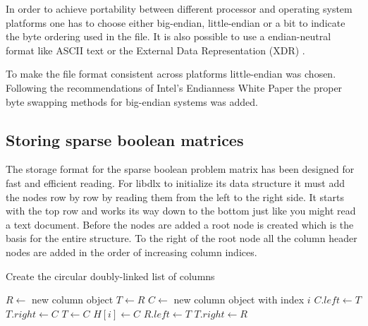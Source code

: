 In order to achieve portability between different processor and operating system platforms one has to choose either big-endian, little-endian or a bit to indicate the byte ordering used in the file.
It is also possible to use a endian-neutral format like ASCII text or the External Data Representation (XDR) \cite{RFC4506}.

To make the file format consistent across platforms little-endian was chosen.
Following the recommendations of Intel's Endianness White Paper \cite{intel-endian} the proper byte swapping methods for big-endian systems was added.




\subsection{Storing sparse boolean matrices}

The storage format for the sparse boolean problem matrix has been designed for fast and efficient reading.
For libdlx to initialize its data structure it must add the nodes row by row by reading them from the left to the right side.
It starts with the top row and works its way down to the bottom just like you might read a text document.
Before the nodes are added a root node is created which is the basis for the entire structure.
To the right of the root node all the column header nodes are added in the order of increasing column indices.

\begin{algorithm}
	\caption{Create the circular doubly-linked list of columns}
	\label{alg:columns}
	\begin{algorithmic}[1]
		\STATE $R \leftarrow$ new column object
		\STATE $T \leftarrow R$
			\STATE $C \leftarrow$ new column object with index $i$
				\STATE $C.left \leftarrow T$
				\STATE $T.right \leftarrow C$
			\ENDIF
			\STATE $T \leftarrow C$
			\STATE $H[i] \leftarrow C$
		\ENDFOR
		\STATE $R.left \leftarrow T$
		\STATE $T.right \leftarrow R$
	\end{algorithmic}
\end{algorithm}

